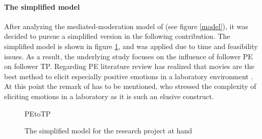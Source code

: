 \documentclass[	
	12pt, %
	a4paper, %
  abstracton
]{scrartcl}\usepackage[]{graphicx}\usepackage[]{color}
\begin{document}

\paragraph{The simplified model}
After analyzing the mediated-moderation model of  (see figure \ref{model}), it was decided to pursue a simplified version in the following contribution. The simplified model is shown in figure \ref{model_simple}, and was applied due to time and feasibility issues. As a result, the underlying study focuses on the influence of follower PE on follower TP. Regarding PE literature review has realized that movies are the best method to elicit especially positive emotions in a laboratory environment \cite{Westermann1996, Gross1995, Rottenberg2007}. At this point the remark of  has to be mentioned, who stressed the complexity of eliciting emotions in a laboratory as it is such an elusive construct. 
\begin{figure}[h]
\centering
\def\svgwidth{\columnwidth}
{PEtoTP}
\caption{The simplified model for the research project at hand}
\label{model_simple}
\end{figure}
\end{document}
